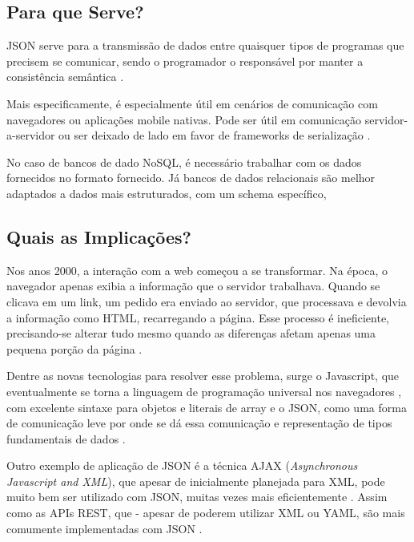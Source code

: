 \subsection{Para que Serve?}
JSON serve para a transmissão de dados entre quaisquer tipos de programas que precisem se comunicar, sendo o programador o responsável por manter a consistência semântica \cite{jsonsaga}.

Mais especificamente, é especialmente útil em cenários de comunicação com navegadores ou aplicações mobile nativas. Pode ser útil em comunicação servidor-a-servidor ou ser deixado de lado em favor de frameworks de serialização \cite{jsonbetterformat}.

No caso de bancos de dado NoSQL, é necessário trabalhar com os dados fornecidos no formato fornecido. Já bancos de dados relacionais são melhor adaptados a dados mais estruturados, com um schema específico\cite{jsonbetterformat}, 




\subsection{Quais as Implicações?}
Nos anos 2000, a interação com a web começou a se transformar. Na época, o navegador apenas exibia a informação que o servidor trabalhava. Quando se clicava em um link, um pedido era enviado ao servidor, que processava e devolvia a informação como HTML, recarregando a página. Esse processo é ineficiente, precisando-se alterar tudo mesmo quando as diferenças afetam apenas uma pequena porção da página \cite{jsonbetterformat}.

Dentre as novas tecnologias para resolver esse problema, surge o Javascript, que eventualmente se torna a linguagem de programação universal nos navegadores \cite{jsonbetterformat}, com excelente sintaxe para objetos e literais de array \cite{jsonnotjavascript} e o JSON, como uma forma de comunicação leve por onde se dá essa comunicação e representação de tipos fundamentais de dados \cite{jsonnotjavascript}.

Outro exemplo de aplicação de JSON é a técnica AJAX (\textit{Asynchronous Javascript and XML}), que apesar de inicialmente planejada para XML, pode muito bem ser utilizado com JSON, muitas vezes mais eficientemente \cite{jsonajax}. Assim como as APIs REST, que - apesar de poderem utilizar XML ou YAML, são mais comumente implementadas com JSON \cite{jsonrest}.